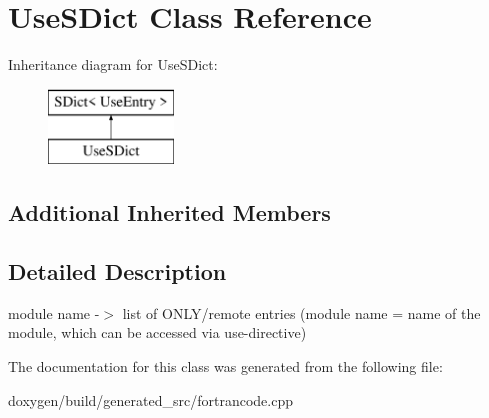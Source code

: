 \hypertarget{class_use_s_dict}{}\section{Use\+S\+Dict Class Reference}
\label{class_use_s_dict}
Inheritance diagram for Use\+S\+Dict\+:\begin{figure}[H]
\begin{center}
\leavevmode
\includegraphics[height=2.000000cm]{class_use_s_dict}
\end{center}
\end{figure}
\subsection*{Additional Inherited Members}


\subsection{Detailed Description}
module name -\/$>$ list of O\+N\+L\+Y/remote entries (module name = name of the module, which can be accessed via use-\/directive) 

The documentation for this class was generated from the following file\+:\begin{DoxyCompactItemize}
\item 
doxygen/build/generated\+\_\+src/fortrancode.\+cpp\end{DoxyCompactItemize}
